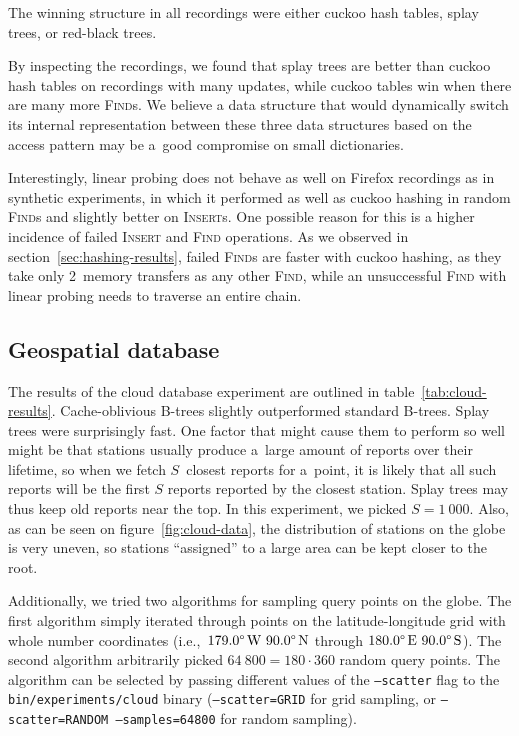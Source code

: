 The winning structure in all recordings were either cuckoo hash tables,
splay trees, or red-black trees.

By inspecting the recordings, we found that splay trees are better than
cuckoo hash tables on recordings with many updates, while cuckoo tables
win when there are many more \textsc{Find}s.
We believe a data structure that would dynamically switch
its internal representation between these three data structures based
on the access pattern may be a~good compromise on small dictionaries.

Interestingly, linear probing does not behave as well on Firefox recordings
as in synthetic experiments, in which it performed as well as cuckoo hashing
in random \textsc{Find}s and slightly better on \textsc{Insert}s. One possible
reason for this is a higher incidence of failed \textsc{Insert} and
\textsc{Find} operations. As we observed in section~\ref{sec:hashing-results},
failed \textsc{Find}s are faster with cuckoo hashing, as they take only
2~memory transfers as any other \textsc{Find}, while an unsuccessful
\textsc{Find} with linear probing needs to traverse an entire chain.

\subsection{Geospatial database}
The results of the cloud database experiment are outlined in
table~\ref{tab:cloud-results}. Cache-oblivious \mbox{B-trees} slightly
outperformed standard \mbox{B-trees}. Splay trees were surprisingly fast.
One factor that might cause them to perform so well might be that stations
usually produce a~large amount of reports over their lifetime, so when we
fetch $S$~closest reports for a~point, it is likely that all such reports will
be the first $S$ reports reported by the closest station. Splay trees may thus
keep old reports near the top. In this experiment, we picked $S=1~000$. Also,
as can be seen on figure~\ref{fig:cloud-data}, the distribution of stations on
the globe is very uneven, so stations ``assigned'' to a large area can be kept
closer to the root.

Additionally, we tried two algorithms for sampling query points on the globe.
The first algorithm simply iterated through points on the latitude-longitude
grid with whole number coordinates (i.e.,\
$179.0\degree\,\text{W}\ 90.0\degree\,\text{N}$ through
$180.0\degree\,\text{E}\ 90.0\degree\,\text{S}$).
The second algorithm arbitrarily picked $64~800=180\cdot 360$ random query
points.
The algorithm can be selected by passing different values of the
\texttt{--scatter} flag to the \texttt{bin/experiments/cloud} binary
(\texttt{--scatter=GRID} for grid sampling, or \texttt{--scatter=RANDOM
--samples=64800} for random sampling).

